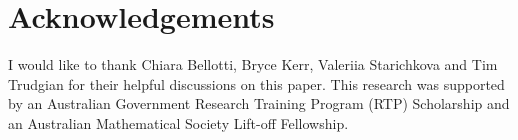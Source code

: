 \documentclass[reqno]{amsart}
\numberwithin{equation}{section}
\theoremstyle{remark}
\begin{document}
\section*{Acknowledgements}
I would like to thank Chiara Bellotti, Bryce Kerr, Valeriia Starichkova and Tim Trudgian for their helpful discussions on this paper. This research was supported by an Australian Government Research Training Program (RTP) Scholarship and an Australian Mathematical Society Lift-off Fellowship.

\newpage

\printbibliography
\end{document}
